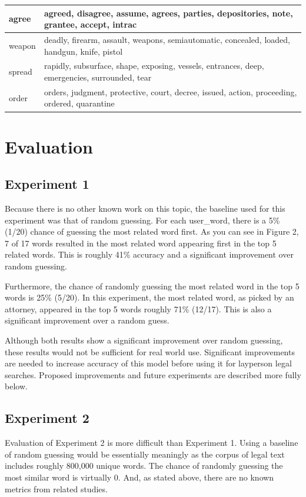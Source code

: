 \documentclass[11pt]{article}
\begin{document}
\begin{table}
\begin{tabular}{|l|p{5cm}|}
    \hline
    agree & agreed, disagree, assume, agrees, parties, depositories, note, grantee, accept, intrac \\
    \hline
    weapon & deadly, firearm, assault, weapons, semiautomatic, concealed, loaded, handgun, knife, pistol \\
    \hline
    spread & rapidly, subsurface, shape, exposing, vessels, entrances, deep, emergencies, surrounded, tear \\
    \hline
    order & orders, judgment, protective, court, decree, issued, action, proceeding, ordered, quarantine \\
    \hline
    \end{tabular}%
  \label{tab:Table2}%
\end{table}%


\section{Evaluation}
\subsection{Experiment 1}
Because there is no other known work on this topic, the baseline used for this experiment was that of random guessing.  For each user\_word, there is a 5\% (1/20) chance of guessing the most related word first.  As you can see in Figure 2, 7 of 17 words resulted in the most related word appearing first in the top 5 related words.  This is roughly 41\% accuracy and a significant improvement over random guessing.  

Furthermore, the chance of randomly guessing the most related word in the top 5 words is 25\% (5/20).  In this experiment, the most related word, as picked by an attorney, appeared in the top 5 words roughly 71\% (12/17).  This is also a significant improvement over a random guess.

Although both results show a significant improvement over random guessing, these results would not be sufficient for real world use.  Significant improvements are needed to increase accuracy of this model before using it for layperson legal searches.  Proposed improvements and future experiments are described more fully below.

\subsection{Experiment 2}
Evaluation of Experiment 2 is more difficult than Experiment 1.  Using a baseline of random guessing would be essentially meaningly as the corpus of legal text includes roughly 800,000 unique words.  The chance of randomly guessing the most similar word is virtually 0.  And, as stated above, there are no known metrics from related studies.  
\end{document}
